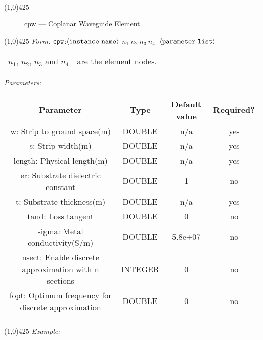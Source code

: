 \documentclass{article}
\begin{document}
\\
\hrulefill \linethickness{0.5mm} \line(1,0){425}
\normalsize
\newline
\begin{figure}[h]
\centerline{\epsfxsize=1in} \caption{cpw ---
Coplanar Waveguide Element.}
\end{figure}
\newline
\linethickness{0.5mm} \line(1,0){425}
\newline
\textit{Form:}
\newline
$\tt cpw$:$\langle \tt{instance\ name}\rangle$ $n_1\ n_2\ n_3\
n_4\ $ $\langle \tt{parameter\ list}\rangle$
\newline
\begin{tabular}{r l}
$n_1$, $n_2$, $n_3$ and $n_4$ & are the element nodes. \\
\end{tabular}
\newline
\textit{Parameters:}
\begin{table}[H]
\begin{tabular}{|c|c|c|c|}
\hline
Parameter&Type&Default value&Required?\\
\hline w: Strip to ground space(m) & DOUBLE & n/a & yes\\
\hline
s: Strip width(m) & DOUBLE & n/a & yes\\
\hline
length: Physical length(m) & DOUBLE & n/a & yes\\
\hline
er: Substrate dielectric constant & DOUBLE & 1 & no\\
\hline
t: Substrate thickness(m) & DOUBLE & n/a & yes\\
\hline
tand: Loss tangent & DOUBLE & 0 & no\\
\hline
sigma: Metal conductivity(S/m) & DOUBLE & 5.8e+07 & no\\
\hline
nsect: Enable discrete approximation with n sections &
INTEGER & 0 & no\\
\hline
fopt: Optimum frequency for discrete approximation & DOUBLE
& 0 & no\\
\par
\hline
\end{tabular}
\end{table}
\noindent\linethickness{0.5mm}\line(1,0){425}
\newline
\textit{Example:}
\newline
\end{document}
